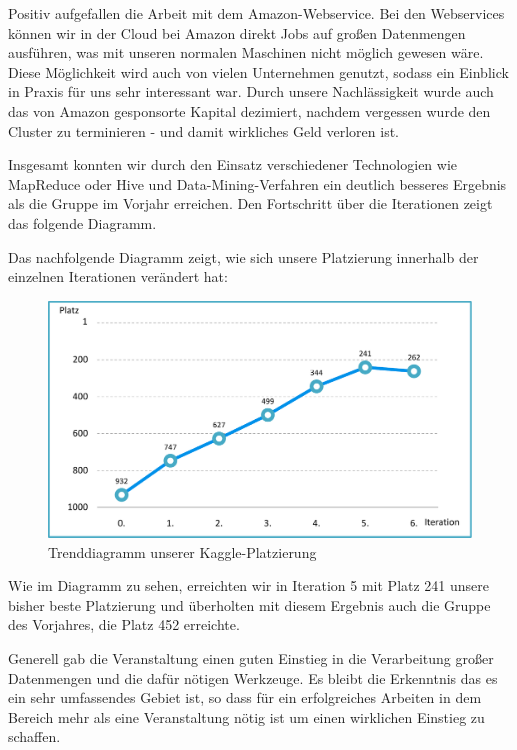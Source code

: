 Positiv aufgefallen die Arbeit mit dem Amazon-Webservice. Bei den Webservices können wir in der Cloud bei Amazon direkt Jobs auf großen Datenmengen ausführen, was mit unseren normalen Maschinen nicht möglich gewesen wäre. Diese Möglichkeit wird auch von vielen Unternehmen genutzt, sodass ein Einblick in Praxis für uns sehr interessant war. Durch unsere Nachlässigkeit wurde auch das von Amazon gesponsorte Kapital dezimiert, nachdem vergessen wurde den Cluster zu terminieren - und damit wirkliches Geld verloren ist.

Insgesamt konnten wir durch den Einsatz verschiedener Technologien wie MapReduce oder Hive und Data-Mining-Verfahren ein deutlich besseres Ergebnis als die Gruppe im Vorjahr erreichen. Den Fortschritt über die Iterationen zeigt das folgende Diagramm.

Das nachfolgende Diagramm zeigt, wie sich unsere Platzierung innerhalb der einzelnen Iterationen verändert hat:

\begin{figure}[H]
\centering
\includegraphics[width=0.85\linewidth]{Bilder/Trenddiagramm_Platzierungen}
\caption{Trenddiagramm unserer Kaggle-Platzierung}
\label{fig:Trenddiagramm_Platzierungen}
\end{figure}

Wie im Diagramm zu sehen, erreichten wir in Iteration 5 mit Platz 241 unsere bisher beste Platzierung und überholten mit diesem Ergebnis auch die Gruppe des Vorjahres, die Platz 452 erreichte.

Generell gab die Veranstaltung einen guten Einstieg in die Verarbeitung großer Datenmengen und die dafür nötigen Werkzeuge. Es bleibt die Erkenntnis das es ein sehr umfassendes Gebiet ist, so dass für ein erfolgreiches Arbeiten in dem Bereich mehr als eine Veranstaltung nötig ist um einen wirklichen Einstieg zu schaffen.

